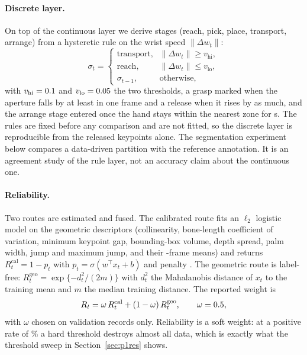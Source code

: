 \documentclass{swmcmthesis}
\begin{document}
\paragraph{Discrete layer.} On top of the continuous layer we derive
\slotNStages{} stages (reach, pick, place, transport, arrange) from a hysteretic rule on
the wrist speed $\lVert\Delta w_t\rVert$:
\begin{equation}
\sigma_t=
\begin{cases}
\text{transport}, & \lVert\Delta w_t\rVert\ge v_{\mathrm{hi}},\\[2pt]
\text{reach}, & \lVert\Delta w_t\rVert\le v_{\mathrm{lo}},\\[2pt]
\sigma_{t-1}, & \text{otherwise},
\end{cases}
\label{eq:stagerule}
\end{equation}
with $v_{\mathrm{hi}}=0.1$ and $v_{\mathrm{lo}}=0.05$ the two thresholds,
a grasp marked when the aperture falls by at least \slotAGrasp{} in one frame and a
release when it rises by as much, and the arrange stage entered once the hand stays
within the nearest zone for \slotTArrange{} s. The rules are fixed before any
comparison and are not fitted, so the
discrete layer is reproducible from the released keypoints alone. The
segmentation experiment below compares a data-driven partition with the reference
annotation. It is an agreement study of the rule layer, not an accuracy claim
about the continuous one.

\paragraph{Reliability.} Two routes are estimated and fused. The calibrated route
fits an $\ell_2$ logistic model on the geometric descriptors (collinearity, bone-length coefficient of variation, minimum keypoint
gap, bounding-box volume, depth spread, palm width, jump and maximum jump, and
their \slotSmoothWin{}-frame means) and returns $R^{\mathrm{cal}}_t=1-p_t$ with
$p_t=\sigma(w^{\top}x_t+b)$ and penalty \slotLogitC. The geometric route is
label-free: $R^{\mathrm{geo}}_t=\exp\{-d_t^{2}/(2m)\}$ with $d_t^{2}$ the
Mahalanobis distance of $x_t$ to the training mean and $m$ the median training
distance. The reported weight is
\begin{equation}
R_t=\omega\,R^{\mathrm{cal}}_t+(1-\omega)\,R^{\mathrm{geo}}_t,
\qquad \omega=0.5,
\label{eq:relfuse}
\end{equation}
with $\omega$ chosen on validation records only. Reliability is a soft weight: at a
positive rate of \slotPRelPosRateTest{}\% a hard
threshold destroys almost all data, which is exactly what the threshold sweep in
Section~\ref{sec:p1res} shows.
\end{document}
